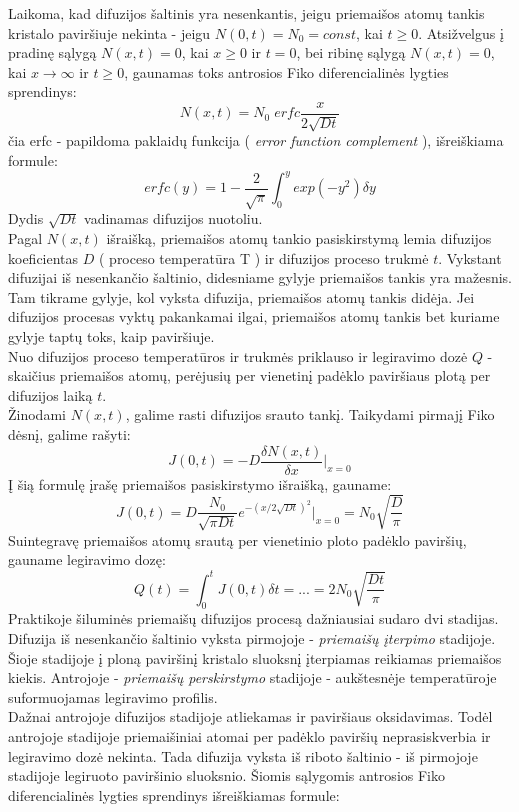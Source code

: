 \documentclass[11pt,a4paper]{article}
\begin{document}
Laikoma, kad difuzijos šaltinis yra nesenkantis, jeigu priemaišos atomų tankis kristalo paviršiuje nekinta - jeigu $N(0,t) = N_0 = const$, 
kai $t \geq 0$. Atsižvelgus į pradinę sąlygą $N(x,t) = 0$, kai $x \geq 0 $ ir $t=0$, bei ribinę sąlygą $N(x,t)=0$, 
kai $x \rightarrow \infty$ ir $t \geq 0$, gaunamas toks antrosios Fiko diferencialinės lygties sprendinys:
\[N(x,t) = N_0\;erfc\frac{x}{2\sqrt{Dt}}\]
čia erfc - papildoma paklaidų funkcija ( \emph{error function complement} ), išreiškiama formule:
\[erfc(y) = 1 - \frac{2}{\sqrt{\pi}} \int^y_0 exp(-y^2) \delta y\]
Dydis $\sqrt{Dt}$ vadinamas difuzijos nuotoliu.\\
Pagal $N(x,t)$ išraišką, priemaišos atomų tankio pasiskirstymą lemia difuzijos koeficientas $D$ ( proceso temperatūra T ) ir difuzijos proceso trukmė $t$. Vykstant difuzijai iš nesenkančio šaltinio, didesniame gylyje priemaišos tankis yra mažesnis. Tam tikrame gylyje, kol vyksta difuzija, priemaišos atomų tankis didėja. Jei difuzijos procesas vyktų pakankamai ilgai, priemaišos atomų tankis bet kuriame gylyje taptų toks, kaip paviršiuje.\\
Nuo difuzijos proceso temperatūros ir trukmės priklauso ir legiravimo dozė $Q$ -  skaičius priemaišos atomų, perėjusių per vienetinį padėklo paviršiaus plotą per difuzijos laiką $t$.\\
Žinodami $N(x,t)$, galime rasti difuzijos srauto tankį. Taikydami pirmajį Fiko dėsnį, galime rašyti:
\[ J(0,t) = - D\frac{\delta N(x,t)}{\delta x}|_{x=0}  \]
Į šią formulę įrašę priemaišos pasiskirstymo išraišką, gauname:
\[J(0,t) = D\frac{N_0}{\sqrt{\pi Dt}} e^{-(x/2\sqrt{Dt})^{2}}|_{x=0} = N_0 \sqrt{\frac{D}{\pi}}\]
Suintegravę priemaišos atomų srautą per vienetinio ploto padėklo paviršių, gauname legiravimo dozę:
\[ Q(t) = \int^{t}_{0}J(0,t)\delta t = ... = 2N_0 \sqrt{\frac{Dt}{\pi}} \]
Praktikoje šiluminės priemaišų difuzijos procesą dažniausiai sudaro dvi stadijas. Difuzija iš nesenkančio šaltinio vyksta pirmojoje - \emph{priemaišų įterpimo} stadijoje. Šioje stadijoje į ploną paviršinį kristalo sluoksnį įterpiamas reikiamas priemaišos kiekis. Antrojoje - \emph{priemaišų perskirstymo} stadijoje - aukštesnėje temperatūroje suformuojamas legiravimo profilis.\\
Dažnai antrojoje difuzijos stadijoje atliekamas ir paviršiaus oksidavimas. Todėl antrojoje stadijoje priemaišiniai atomai per padėklo paviršių neprasiskverbia ir legiravimo dozė nekinta. Tada difuzija vyksta iš riboto šaltinio - iš pirmojoje stadijoje legiruoto paviršinio sluoksnio. Šiomis sąlygomis antrosios Fiko diferencialinės lygties sprendinys išreiškiamas formule:
\end{document}

